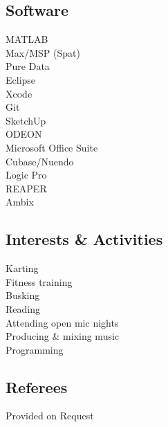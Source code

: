 \documentclass[10pt]{article}
\begin{document}
\begin{minipage}[t]{0.18\textwidth}
    \vspace{5mm}
    
    
    \subsection{Software}
    \normalsize MATLAB\\
    Max/MSP (Spat)\\
    Pure Data\\
    Eclipse\\
    Xcode\\
    Git\\
    SketchUp\\
    ODEON\\
    Microsoft Office Suite\\
    Cubase/Nuendo \\
    Logic Pro\\
    REAPER\\
    Ambix\\
    
    \vspace{5mm}
    
    \subsection*{Interests \& Activities}
    \normalsize 
    Karting\\
    \normalsize Fitness training \\
    Busking\\
    Reading\\
    Attending open mic nights\\
    Producing \& mixing music\\
    Programming \\
    \vspace{5mm}
    
    \subsection*{Referees}
    
    Provided on Request

\end{minipage} %
\end{document}
